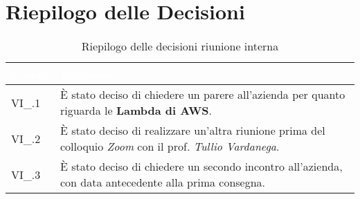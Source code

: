\section{Riepilogo delle Decisioni}


\begin{table}[!htbp]
\renewcommand{\arraystretch}{1.5}
\begin{tabular}{m{}<{\centering}  m{}<{\centering}}
\rowcolor{darkblue} \textcolor{white}{\textbf{Codice}} & \textcolor{white}{\textbf{Decisione}} \\
\hline
VI\_\D{}.1 & È stato deciso di chiedere un parere all'azienda per quanto riguarda le \textbf{Lambda di AWS}.\\
\rowcolor{gray!10} VI\_\D{}.2 &  È stato deciso di realizzare un'altra riunione prima del colloquio \textit{Zoom} con il prof. \textit{Tullio Vardanega}.\\
VI\_\D{}.3 & È stato deciso di chiedere un secondo incontro all'azienda, con data antecedente alla prima consegna.\\
\end{tabular}
\caption{Riepilogo delle decisioni riunione interna \D{}}
\end{table}
